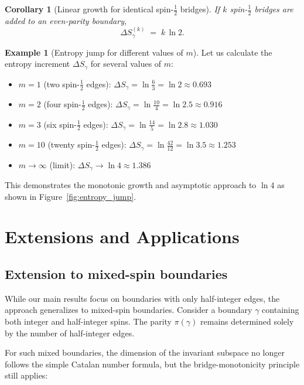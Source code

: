 \documentclass[11pt, a4paper]{article}
\theoremstyle{plain}
\newtheorem{corollary}[theorem]{Corollary}
\theoremstyle{definition}
\newtheorem{example}{Example}
\theoremstyle{remark}
\begin{document}
\begin{corollary}[Linear growth for identical spin-$\tfrac12$ bridges]
\label{cor:linear}
If $k$ spin-$\tfrac12$ bridges are added to an even-parity boundary,
\[  \Delta S_{\gamma}^{(k)} \;=\; k\,\ln 2 .\]
\end{corollary}

\begin{example}[Entropy jump for different values of $m$]
\label{ex:entropy_jumps}
Let us calculate the entropy increment $\Delta S_{\gamma}$ for several values of $m$:

\begin{itemize}
\item $m=1$ (two spin-$\frac{1}{2}$ edges): $\Delta S_{\gamma} = \ln\frac{6}{3} = \ln 2 \approx 0.693$
\item $m=2$ (four spin-$\frac{1}{2}$ edges): $\Delta S_{\gamma} = \ln\frac{10}{4} = \ln 2.5 \approx 0.916$
\item $m=3$ (six spin-$\frac{1}{2}$ edges): $\Delta S_{\gamma} = \ln\frac{14}{5} = \ln 2.8 \approx 1.030$
\item $m=10$ (twenty spin-$\frac{1}{2}$ edges): $\Delta S_{\gamma} = \ln\frac{42}{12} = \ln 3.5 \approx 1.253$
\item $m \to \infty$ (limit): $\Delta S_{\gamma} \to \ln 4 \approx 1.386$
\end{itemize}

This demonstrates the monotonic growth and asymptotic approach to $\ln 4$ as shown in Figure~\ref{fig:entropy_jump}.
\end{example}

\section{Extensions and Applications}
\label{sec:extensions}

\subsection{Extension to mixed-spin boundaries}
\label{sec:mixed_spin}

While our main results focus on boundaries with only half-integer edges, the approach generalizes to mixed-spin boundaries. Consider a boundary $\gamma$ containing both integer and half-integer spins. The parity $\pi(\gamma)$ remains determined solely by the number of half-integer edges.

For such mixed boundaries, the dimension of the invariant subspace no longer follows the simple Catalan number formula, but the bridge-monotonicity principle still applies:
\end{document}

